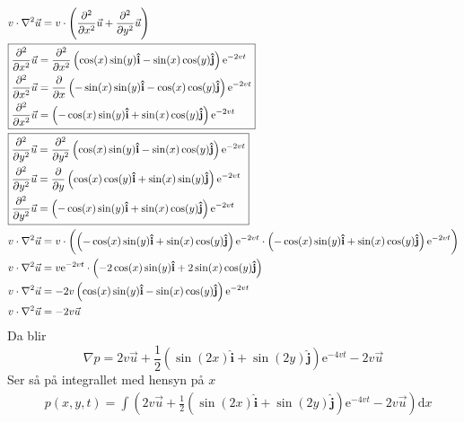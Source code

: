 \documentclass[a4paper,10pt,norsk]{article}
\newcommand{\dd}[1]{\mathrm{d}#1}
\newcommand{\uvec}[1]{\boldsymbol{\hat{\textbf{#1}}}}
\begin{document}
		\begin{align*}
			& v \cdot \nabla^2 \vec{u} = v \cdot \left( \frac{\partial ^2}{\partial x^2} \vec{u} + \frac{\partial ^2}{\partial y^2} \vec{u}  \right) \\
			&\boxed{%
				\begin{aligned}
					&\frac{\partial ^2}{\partial x^2} \vec{u} = \frac{\partial ^2}{\partial x^2 } \left( \cos(x) \sin(y) \uvec{i} - \sin(x) \cos(y) \uvec{j} \right) \mathrm{e}^{-2vt}\\ 
					&\frac{\partial ^2}{\partial x^2} \vec{u} = \frac{\partial }{\partial x} \left( -\sin(x) \sin(y) \uvec{i} - \cos(x) \cos(y) \uvec{j} \right) \mathrm{e}^{-2vt}\\
					& \frac{\partial ^2}{\partial x^2} \vec{u} = \left(- \cos(x)\sin(y) \uvec{i} + \sin(x) \cos(y) \uvec{j}  \right) \mathrm{e}^{-2vt}
			\end{aligned}}\\
			&\boxed{%
				\begin{aligned}
					&\frac{\partial ^2}{\partial y^2} \vec{u} = \frac{\partial ^2}{\partial y^2 } \left( \cos(x) \sin(y) \uvec{i} - \sin(x) \cos(y) \uvec{j} \right) \mathrm{e}^{-2vt}\\ 
					&\frac{\partial ^2}{\partial y^2} \vec{u} = \frac{\partial }{\partial y} \left( \cos(x) \cos(y) \uvec{i} + \sin(x) \sin(y) \uvec{j} \right) \mathrm{e}^{-2vt}\\
					& \frac{\partial ^2}{\partial y^2} \vec{u} = \left(- \cos(x) \sin(y) \uvec{i} + \sin(x) \cos(y) \uvec{j}  \right) \mathrm{e}^{-2vt}
			\end{aligned}}\\
			& v \cdot \nabla^2 \vec{u} = v \cdot \left ( \left(- \cos(x)\sin(y) \uvec{i} + \sin(x) \cos(y) \uvec{j}  \right) \mathrm{e}^{-2vt}
			\cdot \left(- \cos(x) \sin(y) \uvec{i} + \sin(x) \cos(y) \uvec{j}  \right) \mathrm{e}^{-2vt} \right)\\
			& v \cdot \nabla^2 \vec{u} = v \mathrm{e}^{-2vt} \cdot \left( -2 \cos(x) \sin(y) \uvec{i} + 2 \sin(x) \cos(y) \uvec{j} \right) \\
			& v \cdot \nabla^2 \vec{u} =-2v \left(\cos(x) \sin(y) \uvec{i} - \sin(x) \cos(y) \uvec{j}  \right)  \mathrm{e}^{-2vt}\\
			& v \cdot \nabla^2 \vec{u} = - 2v \vec{u} 
		\end{align*}
		Da blir \[
		\nabla p =2v \vec{u} + \frac{1}{2} \left( \sin(2x) \uvec{i} + \sin(2y) \uvec{j} \right) \mathrm{e}^{-4vt} - 2v \vec{u} 
		\] 
		Ser så på integrallet med hensyn på $x$ 
		\begin{align*}
			&p(x,y,t) = \int \left( 2v \vec{u} + \frac{1}{2} \left( \sin(2x) \uvec{i} + \sin(2y) \uvec{j} \right) \mathrm{e}^{-4vt} - 2v \vec{u} \right) \dd{x}
		\end{align*}
\end{document}

